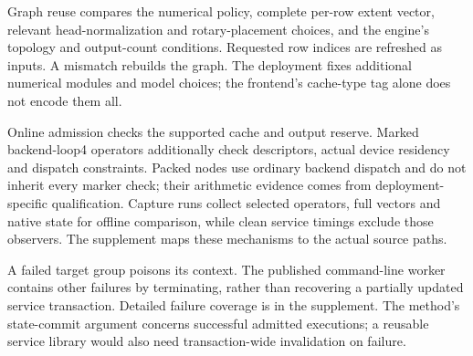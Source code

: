 Graph reuse compares the numerical policy, complete per-row extent vector, relevant head-normalization and rotary-placement choices, and the engine's topology and output-count conditions. Requested row indices are refreshed as inputs. A mismatch rebuilds the graph. The deployment fixes additional numerical modules and model choices; the frontend's cache-type tag alone does not encode them all.

Online admission checks the supported cache and output reserve. Marked backend-loop4 operators additionally check descriptors, actual device residency and dispatch constraints. Packed nodes use ordinary backend dispatch and do not inherit every marker check; their arithmetic evidence comes from deployment-specific qualification. Capture runs collect selected operators, full vectors and native state for offline comparison, while clean service timings exclude those observers. The supplement maps these mechanisms to the actual source paths.

A failed target group poisons its context. The published command-line worker contains other failures by terminating, rather than recovering a partially updated service transaction. Detailed failure coverage is in the supplement. The method's state-commit argument concerns successful admitted executions; a reusable service library would also need transaction-wide invalidation on failure.
